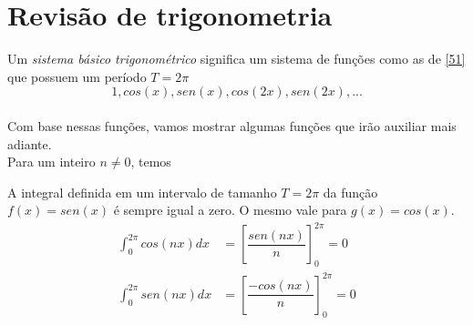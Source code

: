 \section{Revisão de trigonometria}

Um \textit{sistema básico trigonométrico} significa um sistema de funções como 
as de \ref{51} que possuem um período $T=2\pi$\\
\begin{equation}
\label{eq:51}
    1, cos(x), sen(x), cos(2x), sen(2x), ... 
\end{equation}
\\
Com base nessas funções, vamos mostrar algumas funções que irão auxiliar mais
adiante.\\


Para um inteiro $n \neq 0$, temos\\
\begin{definicao}
    \label{def:52}
    A integral definida em um intervalo de tamanho $T=2\pi$ da função $f(x)=sen(x)$ é sempre 
    igual a zero. O mesmo vale para $g(x)=cos(x)$.
    \begin{equation}
        \begin{split}
            \int_{0}^{2\pi}cos(nx)dx & = [\dfrac{sen(nx)}{n}]_{0}^{2\pi} = 0\\
            \int_{0}^{2\pi}sen(nx)dx & = [\dfrac{-cos(nx)}{n}]_{0}^{2\pi} = 0
        \end{split}
    \end{equation}
\end{definicao}

